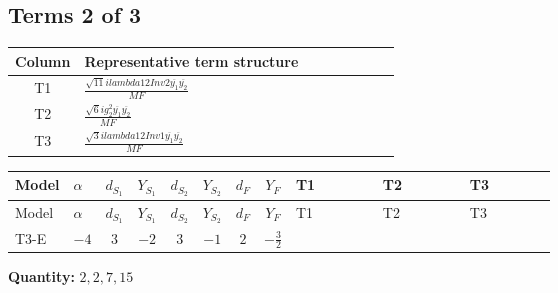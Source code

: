 \documentclass[8pt]{article}
\begin{document}
\begin{landscape}
\subsection*{Terms 2 of 3}
\begin{center}
\begin{tabular}{@{}c >{\raggedright\arraybackslash}p{0.82\linewidth}@{}}
\toprule
Column & Representative term structure \\
\midrule
T1 & \(\displaystyle \frac{\sqrt{11} i lambda12Inv2 \overline{y_{1}} \overline{y_{2}}}{MF}\) \\
\midrule
T2 & \(\displaystyle \frac{\sqrt{6} i g_{2}^{2} \overline{y_{1}} \overline{y_{2}}}{MF}\) \\
\midrule
T3 & \(\displaystyle \frac{\sqrt{3} i lambda12Inv1 \overline{y_{1}} \overline{y_{2}}}{MF}\) \\
\midrule
\bottomrule
\end{tabular}
\end{center}
\smallskip
\tiny
\begin{longtable}{@{}llcccccc >{\raggedright\arraybackslash}p{0.21\linewidth} >{\raggedright\arraybackslash}p{0.21\linewidth} >{\raggedright\arraybackslash}p{0.21\linewidth}@{}}
\toprule
Model & $\alpha$ & $d_{S_1}$ & $Y_{S_1}$ & $d_{S_2}$ & $Y_{S_2}$ & $d_F$ & $Y_F$ & T1 & T2 & T3 \\
\midrule
\endfirsthead
\toprule
Model & $\alpha$ & $d_{S_1}$ & $Y_{S_1}$ & $d_{S_2}$ & $Y_{S_2}$ & $d_F$ & $Y_F$ & T1 & T2 & T3 \\
\midrule
\endhead
T3-E & $-4$ & $3$ & $-2$ & $3$ & $-1$ & $2$ & $-\frac{3}{2}$ & \scriptsize\adjustbox{max width=\linewidth}{$\begin{gathered} - \frac{3 \sqrt{11} i lambda12Inv2 \overline{y_{1}} \overline{y_{2}}}{22 MF}\end{gathered}$} & \scriptsize\adjustbox{max width=\linewidth}{$\begin{gathered} - \frac{\sqrt{6} i g_{2}^{2} \overline{y_{1}} \overline{y_{2}}}{3 MF}\end{gathered}$} & \scriptsize\adjustbox{max width=\linewidth}{$\begin{gathered} \frac{\sqrt{3} i lambda12Inv1 \overline{y_{1}} \overline{y_{2}}}{6 MF}\end{gathered}$} \\
\midrule
\bottomrule
\end{longtable}
\clearpage
\noindent\textbf{Quantity: }$\mathrm{2,2,7,15}$\par\smallskip

\end{landscape}
\end{document}
